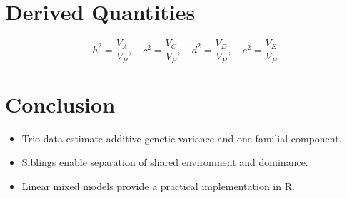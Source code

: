 \documentclass[12pt]{article}
\begin{document}
\section{Derived Quantities}

\[
h^2=\frac{V_A}{V_P},\quad
c^2=\frac{V_C}{V_P},\quad
d^2=\frac{V_D}{V_P},\quad
e^2=\frac{V_E}{V_P}
\]

\section{Conclusion}

\begin{itemize}
\item Trio data estimate additive genetic variance and one familial component.
\item Siblings enable separation of shared environment and dominance.
\item Linear mixed models provide a practical implementation in R.
\end{itemize}
\end{document}

